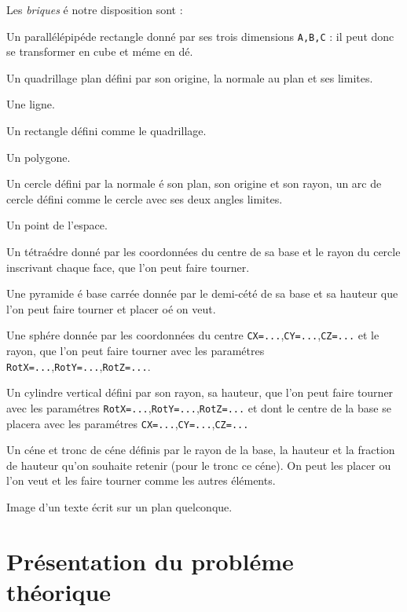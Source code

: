 \documentclass[11pt,frenchb,BCOR10mm,DIV12,bibliography=totoc,parskip=false,smallheadings
    headexclude,footexclude,oneside]{pst-doc}
\begin{document}
Les \textit{briques} é notre disposition sont :
\begin{compactitem}
  \item Un parallélépipéde rectangle donné par ses trois
  dimensions \verb+A,B,C+ : il peut donc se transformer en cube et
  méme en dé.
  \item Un quadrillage plan défini par son origine, la normale au
  plan et ses limites.
  \item Une ligne.
  \item Un rectangle défini comme le quadrillage.
  \item Un polygone.
  \item Un cercle défini par la normale é son plan, son origine et
  son rayon, un arc de cercle défini comme le cercle avec ses deux angles limites.
  \item Un point de l'espace.
  \item Un tétraédre donné par les coordonnées du centre de sa base et le rayon du
  cercle inscrivant chaque face, que l'on peut faire
  tourner.
  \item Une pyramide é base carrée donnée par le demi-cété de sa
  base et sa hauteur que l'on peut faire tourner et placer oé on
  veut.
  \item Une sphére donnée par les coordonnées du centre \verb+CX=...+,\verb+CY=...+,\verb+CZ=...+
   et le rayon, que l'on peut faire
  tourner avec les paramétres
  \verb+RotX=...+,\verb+RotY=...+,\verb+RotZ=...+.
  \item Un cylindre vertical défini par son rayon, sa hauteur, que l'on peut faire
  tourner avec les paramétres
  \verb+RotX=...+,\verb+RotY=...+,\verb+RotZ=...+ et dont le centre
  de la base se placera avec les paramétres \verb+CX=...+,\verb+CY=...+,\verb+CZ=...+
  \item Un céne et tronc de céne définis par le rayon de la base,
  la hauteur et la fraction de hauteur qu'on souhaite retenir (pour le tronc ce céne).
  On peut les placer ou l'on veut et les faire tourner comme les autres éléments.
  \item Image d'un texte écrit sur un plan quelconque.
\end{compactitem}

\clearpage
\section{Présentation du probléme théorique}
\end{document}
